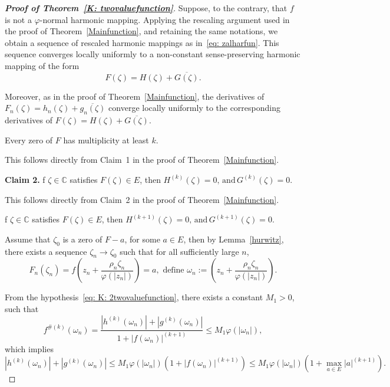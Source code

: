 \documentclass[10pt,a4paper]{amsart}
\numberwithin{equation}{section}
\begin{document}
\begin{proof}[\bf{Proof of Theorem~\ref{K: twovaluefunction}}]
 Suppose, to the contrary, that $f$ is not a
  $\varphi$-normal harmonic mapping.
   Applying the rescaling
argument used in the proof of Theorem~\ref{Mainfunction}, 
and retaining the same notations, we obtain
  a sequence of rescaled harmonic mappings as in~\eqref{eq: zalharfun}.
This sequence converges locally uniformly to a non-constant 
sense-preserving harmonic mapping of the form
  \[
  F(\zeta)=H(\zeta)+\overline{G(\zeta)}.
  \]

Moreover, as in the proof of Theorem~\ref{Mainfunction}, the derivatives
of $F_n(\zeta)=h_n(\zeta)+\overline{g_n(\zeta)}$ converge locally 
uniformly to the corresponding 
derivatives of $F(\zeta)=H(\zeta)+\overline{G(\zeta)}$.\smallskip

 Every zero of $F$ has multiplicity 
at least $k$.\smallskip

This follows directly from Claim~1 in the proof of
Theorem~\ref{Mainfunction}.\smallskip

 \noindent
\textbf{Claim 2.}
f $\zeta \in \mathbb{C}$ satisfies $F(\zeta)\in E$, then
$
H^{(k)}(\zeta)=0,\,
\text{and}\,
G^{(k)}(\zeta)=0.
$\smallskip

This follows directly from Claim~2 in the proof of
Theorem~\ref{Mainfunction}.
\smallskip

 f $\zeta \in \mathbb{C}$ satisfies $F(\zeta)\in E$, 
then
$ H^{(k+1)}(\zeta)=0, 
\,\text{and} \, G^{(k+1)}(\zeta)=0$.

Assume that $\zeta_0$ is a zero of $F-a$, for some $a\in E$, 
then by Lemma~\ref{hurwitz}, there exists a sequence $\zeta_n \to \zeta_0$
 such that for all sufficiently large $n$,
 \[
 F_n(\zeta_n)=f\!\left(
z_n+\frac{\rho_n\zeta_n}{\varphi(|z_n|)}
\right)=a, \,\, \text{define} \,\, \omega_n:=\!\left(
z_n+\frac{\rho_n\zeta_n}{\varphi(|z_n|)}
\right).
 \]
 \smallskip
 
From the hypothesis~\eqref{eq: K: 2twovaluefunction}, there exists a constant 
$M_1>0$, such that
 \[
 f^{\#(k)}(\omega_n)=\frac{|h^{(k)}(\omega_n)|+
 |g^{(k)}(\omega_n)|}{1+|f(\omega_n)|^{(k+1)}}
 \leq M_1\varphi(|\omega_n|),
 \]
 which implies
\begin{equation}\label{*2}
  {|h^{(k)}(\omega_n)|+|g^{(k)}(\omega_n)|}\leq 
  M_1\varphi(|\omega_n|)({1+|f(\omega_n)|^{(k+1)}})
\leq M_1\varphi(|\omega_n|)({1+\max_{a\in E}|a|^{(k+1)}}).
\end{equation}


\end{proof}
\end{document}
